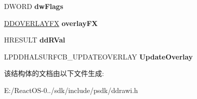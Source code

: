 \begin{DoxyCompactItemize}
D\+W\+O\+RD {\bfseries dw\+Flags}
\item 
\mbox{\label{struct___d_d_h_a_l___u_p_d_a_t_e_o_v_e_r_l_a_y_d_a_t_a_ade0eede2006142ca5a96f69c19dde115}} 
\hyperlink{struct___d_d_o_v_e_r_l_a_y_f_x}{D\+D\+O\+V\+E\+R\+L\+A\+Y\+FX} {\bfseries overlay\+FX}
\item 
\mbox{\label{struct___d_d_h_a_l___u_p_d_a_t_e_o_v_e_r_l_a_y_d_a_t_a_a18c0c6f20de2e5d059e156336712bc74}} 
H\+R\+E\+S\+U\+LT {\bfseries dd\+R\+Val}
\item 
\mbox{\label{struct___d_d_h_a_l___u_p_d_a_t_e_o_v_e_r_l_a_y_d_a_t_a_a52ba179e0768aa5915b7f104cd094360}} 
L\+P\+D\+D\+H\+A\+L\+S\+U\+R\+F\+C\+B\+\_\+\+U\+P\+D\+A\+T\+E\+O\+V\+E\+R\+L\+AY {\bfseries Update\+Overlay}
\end{DoxyCompactItemize}


该结构体的文档由以下文件生成\+:\begin{DoxyCompactItemize}
\item 
E\+:/\+React\+O\+S-\/0../sdk/include/psdk/ddrawi.\+h\end{DoxyCompactItemize}
